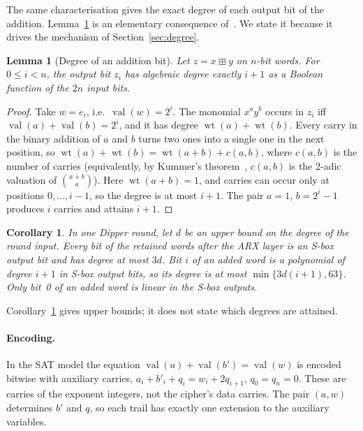 \documentclass[11pt,a4paper]{article}
\newtheorem{lemma}{Lemma}
\newtheorem{corollary}{Corollary}
\theoremstyle{definition}
\theoremstyle{remark}
\newcommand{\add}{\boxplus}
\newcommand{\val}{\operatorname{val}}
\newcommand{\wt}{\operatorname{wt}}
\begin{document}
The same characterisation gives the exact degree of each output bit of the addition. Lemma~\ref{lem:deg} is an elementary consequence of~\cite{braeken2005}. We state it because it drives the mechanism of Section~\ref{sec:degree}.

\begin{lemma}[Degree of an addition bit]\label{lem:deg}
Let $z=x\add y$ on $n$-bit words. For $0\le i<n$, the output bit $z_i$ has algebraic degree exactly $i+1$ as a Boolean function of the $2n$ input bits.
\end{lemma}
\begin{proof}
Take $w=e_i$, i.e.\ $\val(w)=2^i$. The monomial $x^ay^b$ occurs in $z_i$ iff $\val(a)+\val(b)=2^i$, and it has degree $\wt(a)+\wt(b)$. Every carry in the binary addition of $a$ and $b$ turns two ones into a single one in the next position, so $\wt(a)+\wt(b)=\wt(a+b)+c(a,b)$, where $c(a,b)$ is the number of carries (equivalently, by Kummer's theorem~\cite{kummer1852}, $c(a,b)$ is the 2-adic valuation of $\binom{a+b}{a}$). Here $\wt(a+b)=1$, and carries can occur only at positions $0,\dots,i-1$, so the degree is at most $i+1$. The pair $a=1$, $b=2^i-1$ produces $i$ carries and attains $i+1$.
\end{proof}

\begin{corollary}\label{cor:round}
In one Dipper round, let $d$ be an upper bound on the degree of the round input. Every bit of the retained words after the ARX layer is an S-box output bit and has degree at most $3d$. Bit $i$ of an added word is a polynomial of degree $i+1$ in S-box output bits, so its degree is at most $\min\{3d(i+1),63\}$. Only bit~0 of an added word is linear in the S-box outputs.
\end{corollary}
Corollary~\ref{cor:round} gives upper bounds; it does not state which degrees are attained.

\paragraph{Encoding.} In the SAT model the equation $\val(a)+\val(b')=\val(w)$ is encoded bitwise with auxiliary carries, $a_i+b'_i+q_i=w_i+2q_{i+1}$, $q_0=q_n=0$. These are carries of the exponent integers, not the cipher's data carries. The pair $(a,w)$ determines $b'$ and $q$, so each trail has exactly one extension to the auxiliary variables.
\end{document}
